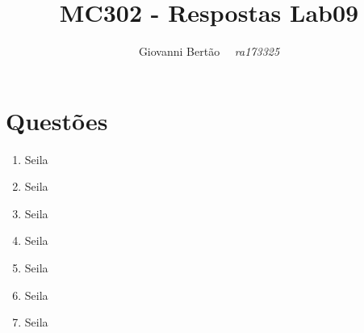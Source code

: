 \documentclass{article}
\author{Giovanni Bertão \    \ \textit{ra173325}}
\title{MC302 - Respostas Lab09}
\begin{document}
	\maketitle
	\section*{Questões}

	\begin{enumerate}
		\item
			Seila
		\item
			Seila
		\item
			Seila
		\item
			Seila
		\item
			Seila
		\item
			Seila
		\item
			Seila
	\end{enumerate}
\end{document}

